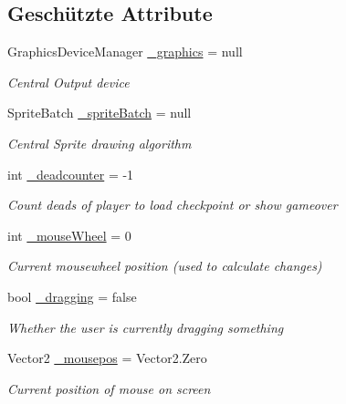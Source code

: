 \subsection*{Geschützte Attribute}
\begin{DoxyCompactItemize}
\item 
Graphics\-Device\-Manager \hyperlink{class_gruppe22_1_1_client_1_1_game_win_aa40dabf43f3be876e3aec217cf20f4ee}{\-\_\-graphics} = null
\begin{DoxyCompactList}\small\item\em Central Output device \end{DoxyCompactList}\item 
Sprite\-Batch \hyperlink{class_gruppe22_1_1_client_1_1_game_win_af52be4e292a7ea1bf8b6f987ec31c52f}{\-\_\-sprite\-Batch} = null
\begin{DoxyCompactList}\small\item\em Central Sprite drawing algorithm \end{DoxyCompactList}\item 
int \hyperlink{class_gruppe22_1_1_client_1_1_game_win_a0aa22f5583a7f0e2ae97d8a33e8b9055}{\-\_\-deadcounter} = -\/1
\begin{DoxyCompactList}\small\item\em Count deads of player to load checkpoint or show gameover \end{DoxyCompactList}\item 
int \hyperlink{class_gruppe22_1_1_client_1_1_game_win_a07b8fca49486bb2e4946165899f027b3}{\-\_\-mouse\-Wheel} = 0
\begin{DoxyCompactList}\small\item\em Current mousewheel position (used to calculate changes) \end{DoxyCompactList}\item 
bool \hyperlink{class_gruppe22_1_1_client_1_1_game_win_a076f4987158764233c25585bcf62b730}{\-\_\-dragging} = false
\begin{DoxyCompactList}\small\item\em Whether the user is currently dragging something \end{DoxyCompactList}\item 
Vector2 \hyperlink{class_gruppe22_1_1_client_1_1_game_win_ae64e39fc0213b7db9121b53cf8bdb499}{\-\_\-mousepos} = Vector2.\-Zero
\begin{DoxyCompactList}\small\item\em Current position of mouse on screen \end{DoxyCompactList}\item 

\end{DoxyCompactItemize}
